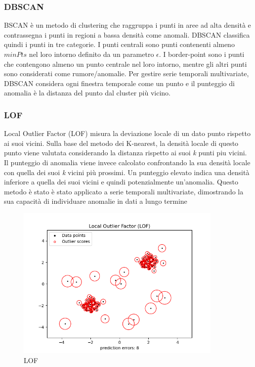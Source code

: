 \subsubsection{DBSCAN}
BSCAN è un metodo di clustering che raggruppa i punti in aree ad alta densità e contrassegna i punti in regioni a bassa densità come anomali.
DBSCAN classifica quindi i punti in tre categorie. I punti centrali sono punti
contenenti almeno $minPts$ nel loro intorno definito da un parametro $\epsilon$. I border-point sono i punti che contengono almeno un punto centrale nel loro intorno, mentre gli altri punti sono considerati come rumore/anomalie. 
Per gestire serie temporali multivariate, DBSCAN considera ogni finestra temporale come un punto e il punteggio di anomalia è la distanza del punto dal cluster più vicino.

\subsubsection{LOF}
Local Outlier Factor (LOF) misura la deviazione locale di un dato punto rispetto ai suoi vicini. Sulla base del metodo dei K-nearest, la densità locale di questo punto viene valutata considerando la distanza rispetto ai suoi \textit{k} punti piu vicini. Il punteggio di anomalia viene invece calcolato confrontando la sua densità locale con quella dei suoi \textit{k} vicini più prossimi. Un punteggio elevato indica una densità inferiore a quella dei suoi vicini e quindi potenzialmente un'anomalia. Questo metodo è stato è stato applicato a serie temporali multivariate, dimostrando la sua capacità di individuare anomalie in dati a lungo termine
\begin{figure}[t]
	\centering
	\includegraphics[width=10cm, scale=1]{images/lof}
	\caption{LOF}
	\label{lof}
\end{figure}

